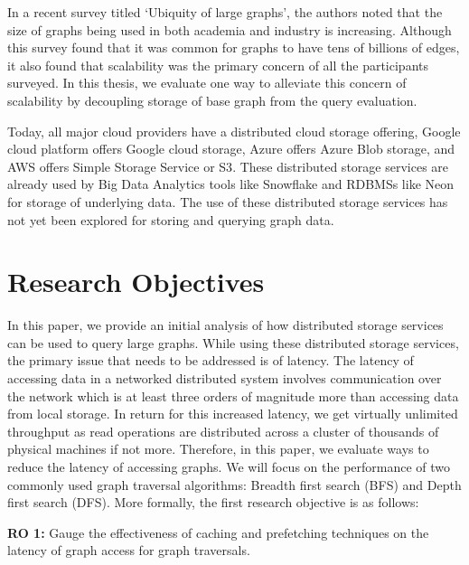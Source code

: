In a recent survey titled `Ubiquity of large graphs'\cite{sahu2017ubiquity}, the
authors noted that the size of graphs being used in both academia and industry
is increasing. Although this survey found that it was common for graphs to have
tens of billions of edges, it also found that scalability was the primary
concern of all the participants surveyed\cite{sahu2017ubiquity}. In this thesis,
we evaluate one way to alleviate this concern of scalability by decoupling
storage of base graph from the query evaluation.

\medskip
Today, all major cloud providers have a distributed cloud storage offering,
Google cloud platform offers Google cloud storage\cite{gcpStorage}, Azure offers
Azure Blob storage\cite{azureStorage}, and AWS offers Simple Storage Service or 
S3\cite{awsS3}. These distributed storage services are already used by Big Data
Analytics tools like Snowflake\cite{snowflake} and RDBMSs like Neon\cite{neonPostgres} 
for storage of underlying data. The use of these distributed storage services has not
yet been explored for storing and querying graph data.

\section{Research Objectives}
In this paper, we provide an initial analysis of how distributed storage services can 
be used to query large graphs. While using these distributed storage services, the primary
issue that needs to be addressed is of latency. The latency of accessing data in a networked
distributed system involves communication over the network which is at least three orders of
magnitude more than accessing data from local storage. In return for this increased latency,
we get virtually unlimited throughput as read operations are distributed across a cluster 
of thousands of physical machines if not more. Therefore, in this paper, we evaluate ways to
reduce the latency of accessing graphs. We will focus on the 
performance of two commonly used graph traversal algorithms: Breadth first search 
(BFS) and Depth first search (DFS). More formally, the first research
objective is as follows:
\begin{displayquote}
    \textbf{RO 1:} Gauge the effectiveness of caching and prefetching techniques
    on the latency of graph access for graph traversals.
\end{displayquote}


